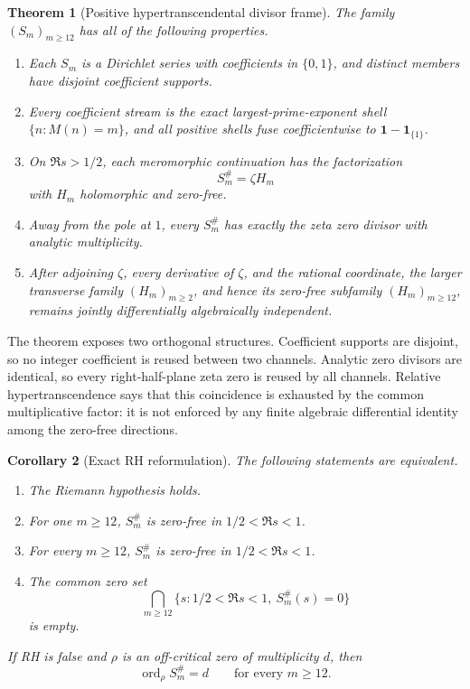 \documentclass[11pt]{article}
\newtheorem{theorem}{Theorem}[section]
\newtheorem{corollary}[theorem]{Corollary}
\theoremstyle{definition}
\theoremstyle{remark}
\newcommand{\ord}{\operatorname{ord}}
\begin{document}
\begin{theorem}[Positive hypertranscendental divisor frame]\label{thm:frame}
The family \((S_m)_{m\geq12}\) has all of the following properties.
\begin{enumerate}[label=\textup{(\roman*)}]
\item Each \(S_m\) is a Dirichlet series with coefficients in \(\{0,1\}\), and distinct members
have disjoint coefficient supports.
\item Every coefficient stream is the exact largest-prime-exponent shell
\(\{n:M(n)=m\}\), and all positive shells fuse coefficientwise to
\(\mathbf1-\mathbf1_{\{1\}}\).
\item On \(\Re s>1/2\), each meromorphic continuation has the factorization
\[
 S_m^\#=\zeta H_m
\]
with \(H_m\) holomorphic and zero-free.
\item Away from the pole at \(1\), every \(S_m^\#\) has exactly the zeta zero divisor with
analytic multiplicity.
\item After adjoining \(\zeta\), every derivative of \(\zeta\), and the rational coordinate,
the larger transverse family \((H_m)_{m\geq2}\), and hence its zero-free subfamily
\((H_m)_{m\geq12}\), remains jointly differentially algebraically independent.
\end{enumerate}
\end{theorem}

The theorem exposes two orthogonal structures.  Coefficient supports are disjoint, so no integer
coefficient is reused between two channels.  Analytic zero divisors are identical, so every
right-half-plane zeta zero is reused by all channels.  Relative hypertranscendence says that this
coincidence is exhausted by the common multiplicative factor: it is not enforced by any finite
algebraic differential identity among the zero-free directions.

\begin{corollary}[Exact RH reformulation]\label{cor:rh}
The following statements are equivalent.
\begin{enumerate}[label=\textup{(\roman*)}]
\item The Riemann hypothesis holds.
\item For one \(m\geq12\), \(S_m^\#\) is zero-free in \(1/2<\Re s<1\).
\item For every \(m\geq12\), \(S_m^\#\) is zero-free in \(1/2<\Re s<1\).
\item The common zero set
\[
 \bigcap_{m\geq12}\{s:1/2<\Re s<1,\ S_m^\#(s)=0\}
 \]
is empty.
\end{enumerate}
If RH is false and \(\rho\) is an off-critical zero of multiplicity \(d\), then
\[
 \ord_\rho S_m^\#=d
 \qquad\text{for every }m\geq12.
 \tag{6.1}
\]
\end{corollary}
\end{document}
